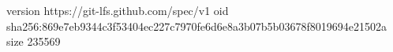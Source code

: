 version https://git-lfs.github.com/spec/v1
oid sha256:869e7eb9344c3f53404ec227c7970fe6d6e8a3b07b5b03678f8019694e21502a
size 235569
